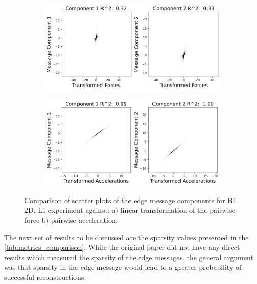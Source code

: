\documentclass[11pt]{article}
\begin{document}
    \begin{figure}[H]
        \centering
        \begin{subfigure}{0.45\textwidth}
            \includegraphics[width=\textwidth]{figs/r1_2d_force_r2.png}
            \caption{}
        \end{subfigure}
        \begin{subfigure}{0.45\textwidth}
            \includegraphics[width=\textwidth]{figs/r1_2d_accel_r2.png}
            \caption{}
        \end{subfigure}
        \caption{Comparison of scatter plots of the edge message components for R1 2D, L1 experiment against: a) linear transformation of the pairwise force b) pairwise acceleration.}
        \label{fig:scatter_plots}
    \end{figure}
    

The next set of results to be discussed are the sparsity values presented in the \ref{tab:metrics_comparison}. 
While the original paper did not have any direct results which measured the sparsity of the edge messages, the general argument was that sparsity in the edge message would lead to a greater probability of successful reconstructions. 
\end{document}
